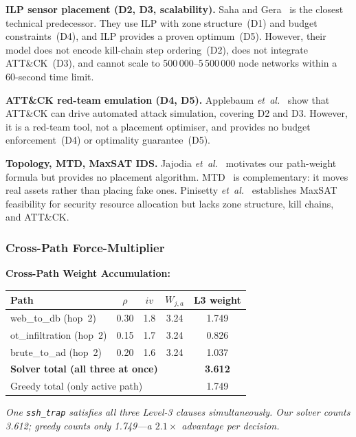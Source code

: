 \documentclass[journal]{IEEEtran}
\newcommand{\xmark}{\textcolor{novelred}{\ding{55}}}
\newcommand{\etal}{\emph{et~al.}}
\begin{document}
\textbf{ILP sensor placement (\xmark{}D2, \xmark{}D3,
scalability).}
Saha and Gera~\cite{saha2015} is the closest technical
predecessor.
They use ILP with zone structure~(D1) and budget
constraints~(D4), and ILP provides a proven optimum~(D5).
However, their model does not encode kill-chain step
ordering~(D2), does not integrate ATT\&CK~(D3),
and cannot scale to 500\,000--5\,500\,000 node networks
within a 60-second time limit.

\textbf{ATT\&CK red-team emulation (\xmark{}D4,
\xmark{}D5).}
Applebaum \etal{}~\cite{applebaum2016} show that ATT\&CK
can drive automated attack simulation, covering D2 and D3.
However, it is a red-team tool, not a placement optimiser,
and provides no budget enforcement~(D4) or optimality
guarantee~(D5).

\textbf{Topology, MTD, MaxSAT IDS.}
Jajodia \etal{}~\cite{jajodia2005} motivates our
path-weight formula but provides no placement algorithm.
MTD~\cite{zhu2013} is complementary: it moves real assets
rather than placing fake ones.
Pinisetty \etal{}~\cite{pinisetty2017} establishes MaxSAT
feasibility for security resource allocation but lacks zone
structure, kill chains, and ATT\&CK.

\subsubsection{Cross-Path Force-Multiplier}

\begin{examplebox}
\textbf{Cross-Path Weight Accumulation:}
\begin{center}
\small
\renewcommand{\arraystretch}{1.15}
\begin{tabular}{@{}lcccc@{}}
\toprule
\textbf{Path} & $\rho$ & $iv$ & $W_{j,a}$ & \textbf{L3 weight}\\
\midrule
web\_to\_db (hop~2)     & 0.30 & 1.8 & 3.24 & 1.749 \\
ot\_infiltration (hop~2)& 0.15 & 1.7 & 3.24 & 0.826 \\
brute\_to\_ad (hop~2)   & 0.20 & 1.6 & 3.24 & 1.037 \\
\midrule
\multicolumn{4}{l}{\textbf{Solver total (all three at once)}}
  & \textbf{3.612} \\
\multicolumn{4}{l}{Greedy total (only active path)}
  & 1.749 \\
\bottomrule
\end{tabular}
\end{center}
\textit{One \texttt{ssh\_trap} satisfies all three Level-3
clauses simultaneously.
Our solver counts 3.612; greedy counts only 1.749---a
$\mathbf{2.1\times}$ advantage per decision.}
\end{examplebox}
\end{document}
